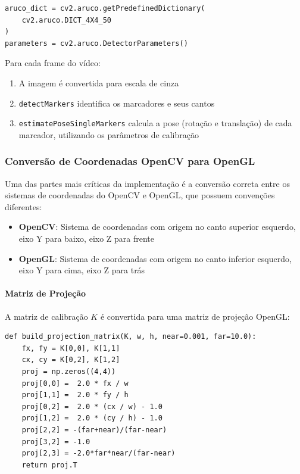 \begin{lstlisting}[caption=Configuração da detecção ArUco]
aruco_dict = cv2.aruco.getPredefinedDictionary(
    cv2.aruco.DICT_4X4_50
)
parameters = cv2.aruco.DetectorParameters()
\end{lstlisting}

Para cada frame do vídeo:
\begin{enumerate}
    \item A imagem é convertida para escala de cinza
    \item \texttt{detectMarkers} identifica os marcadores e seus cantos
    \item \texttt{estimatePoseSingleMarkers} calcula a pose (rotação e translação) de cada marcador, utilizando os parâmetros de calibração
\end{enumerate}

\subsubsection{Conversão de Coordenadas OpenCV para OpenGL}

Uma das partes mais críticas da implementação é a conversão correta entre os sistemas de coordenadas do OpenCV e OpenGL, que possuem convenções diferentes:

\begin{itemize}
    \item \textbf{OpenCV}: Sistema de coordenadas com origem no canto superior esquerdo, eixo Y para baixo, eixo Z para frente
    \item \textbf{OpenGL}: Sistema de coordenadas com origem no canto inferior esquerdo, eixo Y para cima, eixo Z para trás
\end{itemize}

\paragraph{Matriz de Projeção}

A matriz de calibração $K$ é convertida para uma matriz de projeção OpenGL:

\begin{lstlisting}[caption=Conversão da matriz de projeção]
def build_projection_matrix(K, w, h, near=0.001, far=10.0):
    fx, fy = K[0,0], K[1,1]
    cx, cy = K[0,2], K[1,2]
    proj = np.zeros((4,4))
    proj[0,0] =  2.0 * fx / w
    proj[1,1] =  2.0 * fy / h
    proj[0,2] =  2.0 * (cx / w) - 1.0
    proj[1,2] =  2.0 * (cy / h) - 1.0
    proj[2,2] = -(far+near)/(far-near)
    proj[3,2] = -1.0
    proj[2,3] = -2.0*far*near/(far-near)
    return proj.T
\end{lstlisting}

